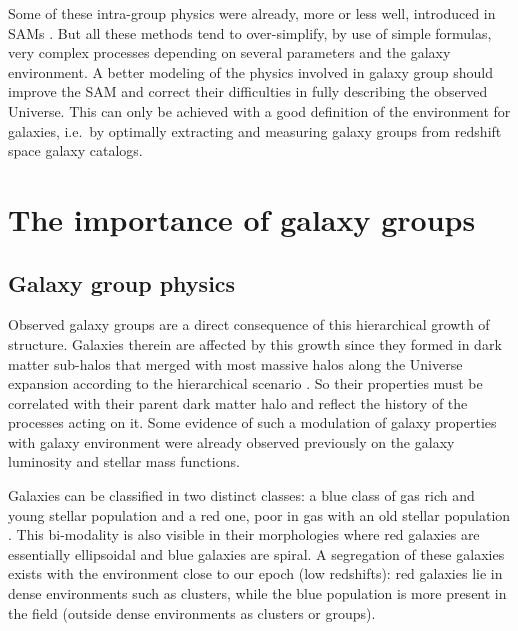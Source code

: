 Some of these intra-group physics were already, more or less well, introduced
in SAMs \citep{Okamoto+03,Lanzoni+05,Font+08,Guo+11}. But all these methods
tend to over-simplify, by use of simple formulas, very complex processes
depending on several parameters and the galaxy environment. A better modeling
of the physics involved in galaxy group should improve the SAM and correct
their difficulties in fully describing the observed Universe. This can only be
achieved with a good definition of the environment for galaxies, i.e.\ by
optimally extracting and measuring galaxy groups from redshift space galaxy
catalogs.

\section{The importance of galaxy groups}
\label{sec:the_importance_of_galaxy_groups}

\subsection{Galaxy group physics}
\label{sub:galaxy_group_physics}

Observed galaxy groups are a direct consequence of this hierarchical growth of
structure. Galaxies therein are affected by this growth since they formed in
dark matter sub-halos that merged with most massive halos along the Universe
expansion according to the hierarchical scenario \citep{Lacey+93}. So their
properties must be correlated with their parent dark matter halo and reflect
the history of the processes acting on it. Some evidence of such a modulation
of galaxy properties with galaxy environment were already observed previously
on the galaxy luminosity \citep{Robotham+10} and stellar mass \citep{Yang+09}
functions.

Galaxies can be classified in two distinct classes: a blue class of
gas rich and young stellar population and a red one, poor in gas with an old
stellar population \citep{Driver+06}. This bi-modality is also visible in their
morphologies where red galaxies are essentially ellipsoidal and blue galaxies
are spiral. A segregation of these galaxies exists with the environment close
to our epoch (low redshifts): red galaxies lie in dense environments such as
clusters, while the blue population is more present in the field (outside dense
environments as clusters or groups).

